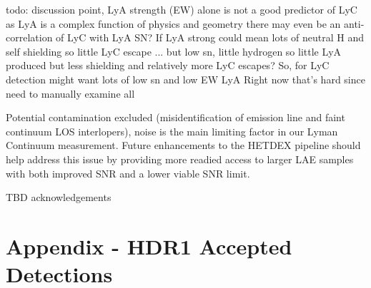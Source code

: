 \documentclass{aastex62}
\begin{document}
{ \color{red} todo: discussion point, LyA strength (EW) alone is not a good predictor of LyC as LyA is a complex function of physics and geometry there may even be an anti-correlation of LyC with LyA SN? If LyA strong could mean lots of neutral H and self shielding so little LyC escape ... but low sn, little hydrogen so little LyA produced but less shielding and relatively more LyC escapes?  So, for LyC detection might want lots of low sn and low EW LyA
Right now that's hard since need to manually examine all }

{ \color{red}Potential contamination excluded (misidentification of emission line and faint continuum LOS interlopers), noise is the main limiting factor in our Lyman Continuum measurement. Future enhancements to the HETDEX pipeline should help address this issue by providing more readied access to larger LAE samples with both improved SNR and a lower viable SNR limit.}



\acknowledgments

TBD acknowledgements

\pagebreak
\appendix


\section{Appendix - HDR1 Accepted Detections}
\end{document}
